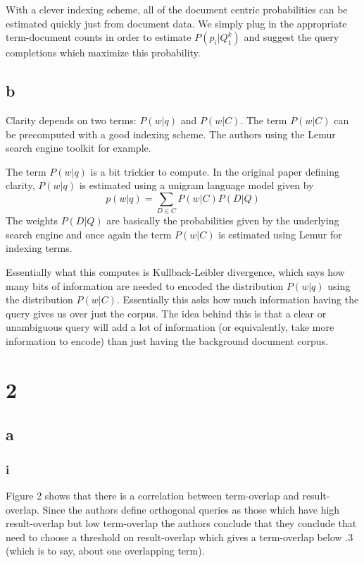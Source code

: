 \documentclass[paper=a4, fontsize=11pt]{scrartcl}
\begin{document}
With a clever indexing scheme, all of the document centric probabilities can
be estimated quickly just from document data. We simply plug in the
appropriate term-document counts in order to estimate $P(p_i|Q_1^k)$ and
suggest the query completions which maximize this probability.

\subsection*{b}

Clarity depends on two terms: $P(w|q)$ and $P(w|C)$.
The term $P(w|C)$ can be precomputed with a good indexing scheme.
The authors using the Lemur search engine toolkit for example.

The term $P(w|q)$ is a bit trickier to compute.
In the original paper defining clarity, $P(w|q)$ is estimated using a unigram
language model given by
$$p(w|q) = \sum_{D \in C} P(w|C)P(D|Q)$$
The weights $P(D|Q)$ are basically the probabilities given by the underlying
search engine and once again the term $P(w|C)$ is estimated using Lemur for
indexing terms.

Essentially what this computes is Kullback-Leibler divergence, which says how
many bits of information are needed to encoded the distribution $P(w|q)$ using
the distribution $P(w|C)$.
Essentially this asks how much information having the query gives us over just
the corpus.
The idea behind this is that a clear or unambiguous query will add a lot of
information (or equivalently, take more information to encode) than just
having the background document corpus.

\section*{2}

\subsection*{a}

\subsubsection*{i}

Figure 2 shows that there is a correlation between term-overlap and
result-overlap. Since the authors define orthogonal queries as those which
have high result-overlap but low term-overlap the authors conclude that they
conclude that need to choose a threshold on result-overlap which gives a
term-overlap below .3 (which is to say, about one overlapping term).
\end{document}
